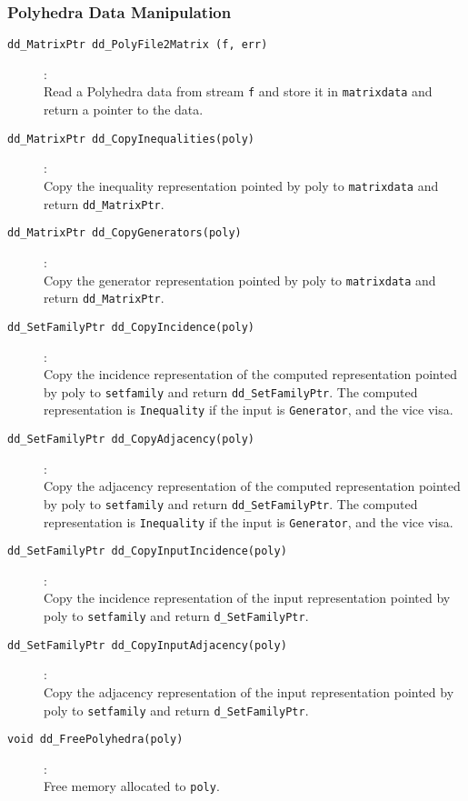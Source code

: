 \documentclass[11pt]{article}
\newcommand {\0} {{\bf 0}}
\begin{document}
\subsubsection{Polyhedra Data Manipulation}
\begin{description}

\item[{\tt dd\_MatrixPtr dd\_PolyFile2Matrix (f, err)}]:\\
Read a Polyhedra data from stream {\tt f} and store it in {\tt matrixdata}
and return a pointer to the data.

\item[{\tt dd\_MatrixPtr dd\_CopyInequalities(poly)}]:\\
Copy the inequality representation pointed by poly to {\tt matrixdata}
and return {\tt dd\_MatrixPtr}.

\item[{\tt dd\_MatrixPtr dd\_CopyGenerators(poly)}]:\\ 
Copy the generator representation pointed by poly to {\tt matrixdata}
and return {\tt dd\_MatrixPtr}.

\item[{\tt dd\_SetFamilyPtr dd\_CopyIncidence(poly)}]:\\ 
Copy the incidence representation of the computed representation
pointed by poly to {\tt setfamily}
and return {\tt dd\_SetFamilyPtr}.  The computed representation is
{\tt Inequality} if the input is {\tt Generator}, and the vice visa.

\item[{\tt dd\_SetFamilyPtr dd\_CopyAdjacency(poly)}]:\\ 
Copy the adjacency representation of the computed representation
pointed by poly to {\tt setfamily}
and return {\tt dd\_SetFamilyPtr}.  The computed representation is
{\tt Inequality} if the input is {\tt Generator}, and the vice visa.

\item[{\tt dd\_SetFamilyPtr dd\_CopyInputIncidence(poly)}]:\\ 
Copy the incidence representation of the input representation
pointed by poly to {\tt setfamily}
and return {\tt d\_SetFamilyPtr}.

\item[{\tt dd\_SetFamilyPtr dd\_CopyInputAdjacency(poly)}]:\\ 
Copy the adjacency representation of the input representation
pointed by poly to {\tt setfamily}
and return {\tt d\_SetFamilyPtr}.

\item[{\tt void dd\_FreePolyhedra(poly)}]:\\
Free memory allocated to {\tt poly}.

\end{description}
\end{document}
